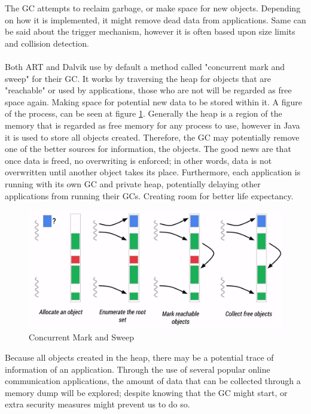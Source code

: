 The GC attempts to reclaim garbage, or make space for new objects. Depending on how it is implemented, it might remove dead data from applications. Same can be said about the trigger mechanism, however it is often based upon size limits and collision detection.\\
\\
Both ART and Dalvik use by default a method called "concurrent mark and sweep" for their GC\cite{ARTGC,DALVIKGC}. It works by traversing the heap for objects that are "reachable" or used by applications, those who are not will be regarded as free space again. Making space for potential new data to be stored within it. A figure of the process, can be seen at figure \ref{fig:mas}. Generally the heap is a region of the memory that is regarded as free memory for any process to use, however in Java it is used to store all objects created. Therefore, the GC may potentially remove one of the better sources for information, the objects. The good news are that once data is freed, no overwriting is enforced; in other words, data is not overwritten until another object takes its place\cite{DALVIKGC}. Furthermore, each application is running with its own GC and private heap, potentially delaying other applications from running their GCs.\cite{AndroidMemManagement} Creating room for better life expectancy.

\begin{figure}[h]
  \includegraphics[width=0.5 \textwidth]{figures/gc}
  \caption{Concurrent Mark and Sweep\cite{ARTGC}}
  \label{fig:mas}
\end{figure}

Because all objects created in the heap, there may be a potential trace of information of an application. Through the use of several popular online communication applications, the amount of data that can be collected through a memory dump will be explored; despite knowing that the GC might start, or extra security measures might prevent us to do so.

